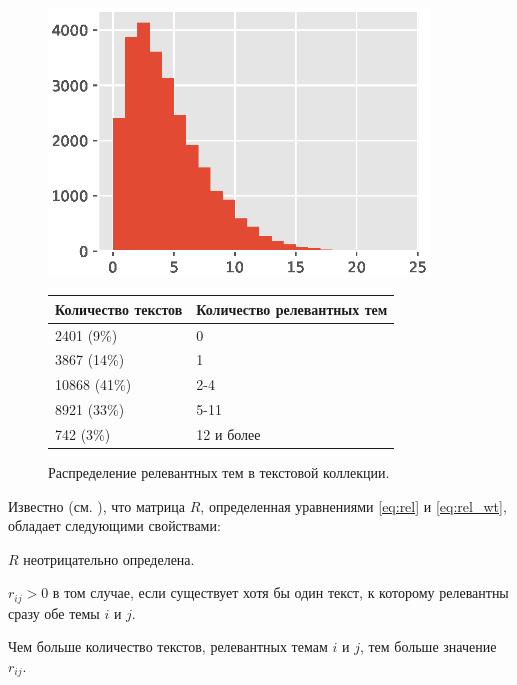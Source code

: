 \documentclass[12pt]{article}
\newenvironment{itemize*}%
{\begin{itemize}%
	\setlength{\itemsep}{0pt}%
	\setlength{\parskip}{0pt}}%
{\end{itemize}}
\begin{document}
\begin{figure}[b]
	\centering
	\caption{Распределение релевантных тем в текстовой коллекции.}
	\label{fig:relevant_counts}
	\begin{minipage}{0.45\textwidth}
		\centering
		\includegraphics[width=0.9\textwidth]{images/relevants_hist}
	\end{minipage}
	\begin{minipage}{0.45\textwidth}
		\centering
		\begin{tabular}{|p{}|p{}|}
			\hline 
			Количество текстов & Количество релевантных тем \\ 
			\hline 
			2401 (9\%)  & 0 \\ 
			3867 (14\%)   & 1 \\ 
			10868 (41\%)  & 2-4 \\ 
			8921 (33\%)   & 5-11 \\ 
			742 (3\%)    & 12 и более \\ 
			\hline 
		\end{tabular} 
	\end{minipage}
\end{figure}

Известно (см. \cite{MirkinChernyak2012}), что матрица $R$, определенная уравнениями \eqref{eq:rel} и \eqref{eq:rel_wt}, обладает следующими свойствами:

\begin{itemize*}
	\item $R$ неотрицательно определена.
	\item $r_{ij}>0$ в том случае, если существует хотя бы один текст, к которому релевантны сразу обе темы $i$ и $j$.
	\item Чем больше количество текстов, релевантных темам $i$ и $j$, тем больше значение $r_{ij}$.
\end{itemize*}
\end{document}
